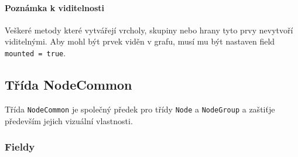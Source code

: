 \paragraph{Poznámka k viditelnosti} Veškeré metody které vytvářejí vrcholy, skupiny nebo hrany tyto prvy nevytvoří viditelnými. Aby mohl být prvek viděn v grafu, musí mu být nastaven field \texttt{mounted = true}.

\subsection{Třída NodeCommon}
Třída \texttt{NodeCommon} je společný předek pro třídy \texttt{Node} a \texttt{NodeGroup} a zaštiťje především jejich vizuální vlastnosti.

\subsubsection*{Fieldy}

